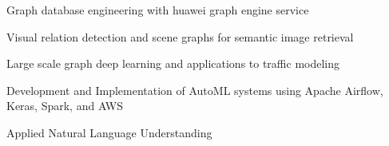 \documentclass[letterpaper]{deedy-resume} %
\begin{document}
\begin{minipage}[t]{0.66\textwidth}
\sectionspace

\begin{tightitemize}
\item Graph database engineering with huawei graph engine service
\item Visual relation detection and scene graphs for semantic image retrieval
\item Large scale graph deep learning and applications to traffic modeling
\end{tightitemize}

\sectionspace


\begin{tightitemize}
\item Development and Implementation of AutoML systems using Apache Airflow, Keras, Spark, and AWS
\item Applied Natural Language Understanding
\end{tightitemize}

\sectionspace


%
%
%
%
%






\end{minipage}
\end{document}

